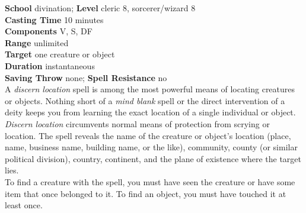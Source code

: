 \textbf{School} divination; \textbf{Level} cleric 8, sorcerer/wizard 8\\
\textbf{Casting Time} 10 minutes\\
\textbf{Components} V, S, DF\\
\textbf{Range} unlimited\\
\textbf{Target} one creature or object\\
\textbf{Duration} instantaneous\\
\textbf{Saving Throw} none; \textbf{Spell Resistance} no\\
A \textit{discern location }spell is among the most powerful means of locating creatures or objects. Nothing short of a \textit{mind blank }spell or the direct intervention of a deity keeps you from learning the exact location of a single individual or object. \textit{Discern location }circumvents normal means of protection from scrying or location. The spell reveals the name of the creature or object's location (place, name, business name, building name, or the like), community, county (or similar political division), country, continent, and the plane of existence where the target lies.\\
To find a creature with the spell, you must have seen the creature or have some item that once belonged to it. To find an object, you must have touched it at least once.\\
